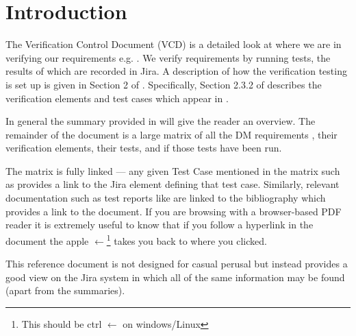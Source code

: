 
\section{Introduction}
\label{sec:intro}

The Verification Control Document (VCD) is a detailed look at where we are in verifying our requirements e.g. .
We verify requirements by
running tests, the results of which are recorded in Jira.  A description of how the verification testing is set up is given in Section 2 of .
Specifically, Section 2.3.2 of  describes the verification elements and test cases which appear in .

In general the summary provided in  will give the reader an overview. The remainder of the document is a large matrix of all the DM requirements , their verification elements, their tests, and if those tests have been run.

The matrix is fully linked --- any given Test Case mentioned in the matrix such as  provides a link to the Jira element defining that test case. 
Similarly, relevant documentation such as test reports like  are linked to the bibliography which provides a link to the document.
If you are browsing with a browser-based PDF reader it is extremely useful to know that if you follow a hyperlink in the document the  apple $\leftarrow$\footnote{This should be ctrl $\leftarrow$ on windows/Linux} takes you back to where you clicked.

This reference document is not designed for casual perusal but instead provides a good view on the Jira system in which all of the same information may be found (apart from the summaries).
